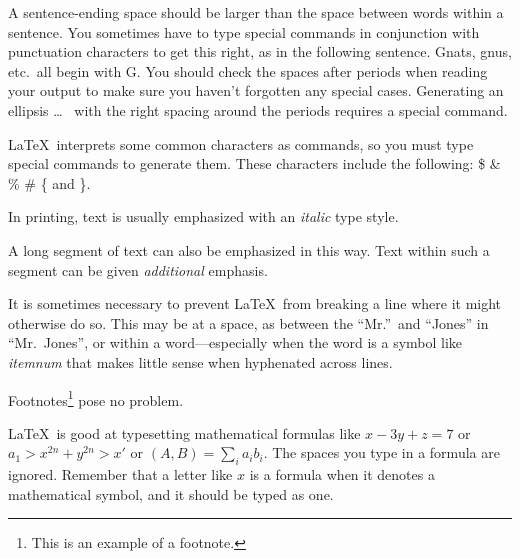 \documentclass{article}      %
\newcommand{\ip}[2]{(#1, #2)}
\begin{document}
A sentence-ending space should be larger than the
space between words within a sentence.  You
sometimes have to type special commands in
conjunction with punctuation characters to get
this right, as in the following sentence.
       Gnats, gnus, etc.\ all  %
       begin with G\@.         %
You should check the spaces after periods when
reading your output to make sure you haven't
forgotten any special cases.  Generating an
ellipsis
       \ldots\               %
with the right spacing around the periods requires
a special command.

\LaTeX\ interprets some common characters as
commands, so you must type special commands to
generate them.  These characters include the
following:
       \$ \& \% \# \{ and \}.

In printing, text is usually emphasized with an
       \emph{italic}
type style.

\begin{em}
   A long segment of text can also be emphasized
   in this way.  Text within such a segment can be
   given \emph{additional} emphasis.
\end{em}

It is sometimes necessary to prevent \LaTeX\ from
breaking a line where it might otherwise do so.
This may be at a space, as between the ``Mr.''\ and
``Jones'' in
       ``Mr.~Jones'',        %
or within a word---especially when the word is a
symbol like
       \mbox{\emph{itemnum}}
that makes little sense when hyphenated across
lines.

Footnotes\footnote{This is an example of a footnote.}
pose no problem.

\LaTeX\ is good at typesetting mathematical formulas
like
       \( x-3y + z = 7 \)
or
       \( a_{1} > x^{2n} + y^{2n} > x' \)
or
       \( \ip{A}{B} = \sum_{i} a_{i} b_{i} \).
The spaces you type in a formula are
ignored.  Remember that a letter like
       $x$                   %
is a formula when it denotes a mathematical
symbol, and it should be typed as one.
\end{document}
